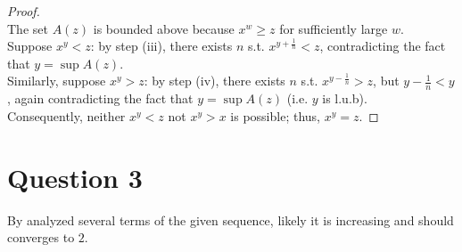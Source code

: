 \documentclass{article}
\begin{document}
\begin{proof}
    \\
    The set $A(z)$ is bounded above because $x^w \geq z$ for sufficiently large $w$.
    \\
    Suppose $x^y < z$: by step (iii), there exists $n$ s.t. $x^{y + \frac{1}{n}} < z$, contradicting the fact that $y = \sup A(z)$.
    \\
    Similarly, suppose $x^y > z$: by step (iv), there exists $n$ s.t. $x^{y - \frac{1}{n}} > z$, but $y - \frac{1}{n} < y$, again contradicting the fact that $y = \sup A(z)$ (i.e. $y$ is l.u.b).
    \\
    Consequently, neither $x^y < z$ not $x^y > x$ is possible; thus, $x^y = z$.
\end{proof}

\section*{Question 3}
By analyzed several terms of the given sequence, likely it is increasing and should converges to $2$.
\end{document}

